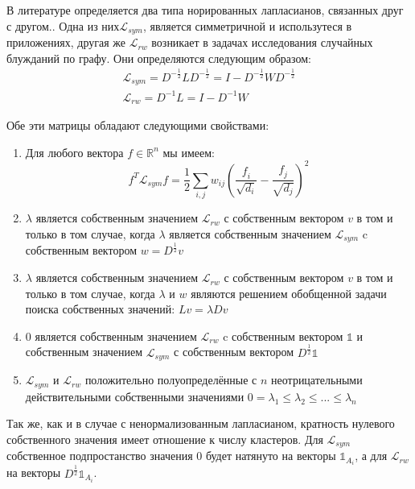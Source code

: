 В литературе определяется два типа норированных лапласианов, связанных друг с другом\cite{von2007tutorial}.. Одна из них$\mathcal{L}_{sym}$, является симметричной и  использутеся в приложениях, другая же $\mathcal{L}_{rw}$ возникает в задачах исследования случайных блужданий по графу. Они определяются следующим образом:
\begin{equation}
\begin{array}{l}
	\mathcal{L}_{sym} = D^{-\frac12} L D^{-\frac12} = I - D^{-\frac12} W D^{-\frac12} \\
	\mathcal{L}_{rw} = D^{-1} L = I - D^{-1} W
\end{array}
\end{equation}

Обе эти матрицы обладают следующими свойствами:
\begin{enumerate}
	\item Для любого вектора $\mathit{f} \in \mathbb{R}^n$ мы имеем:
	\begin{equation}
		\mathit{f}^T \mathcal{L}_{sym} \mathit{f} = \frac12 \sum_{i,j} w_{ij}\left(\frac{\mathit{f}_i}{\sqrt{d_i}} - \frac{\mathit{f}_j}{\sqrt{d_j}}\right)^2
	\end{equation}
	\item $\lambda$ является собственным значением $\mathcal{L}_{rw}$ с собственным вектором $v$ в том и только в том случае, когда $\lambda$ является собственным значением $\mathcal{L}_{sym}$ c собственным вектором $w = D^{\frac12} v$
	\item $\lambda$ является собственным значением $\mathcal{L}_{rw}$ с собственным вектором $v$ в том и только в том случае, когда $\lambda$ и $w$ являются решением обобщенной задачи поиска собственных значений: $L v = \lambda D v$
	\item 0 является собственным значением $\mathcal{L}_{rw}$ c собственным вектором $\mathbb{1}$ и собственным значением $\mathcal{L}_{sym}$ с собственным вектором $D^{\frac12} \mathbb{1}$
	\item $\mathcal{L}_{sym}$ и $\mathcal{L}_{rw}$ положительно полуопределённые с $n$ неотрицательными действительными собственными значениями $0=\lambda_1 \leq \lambda_2 \leq ... \leq \lambda_n$
\end{enumerate}

Так же, как и в случае с ненормализованным лапласианом, кратность нулевого собственного значения имеет отношение к числу кластеров. Для $\mathcal{L}_{sym}$ собственное подпростанство значения 0 будет натянуто на векторы $\mathbb{1}_{A_i}$, а для $\mathcal{L}_{rw}$ на векторы $D^{\frac12} \mathbb{1}_{A_i}$.

